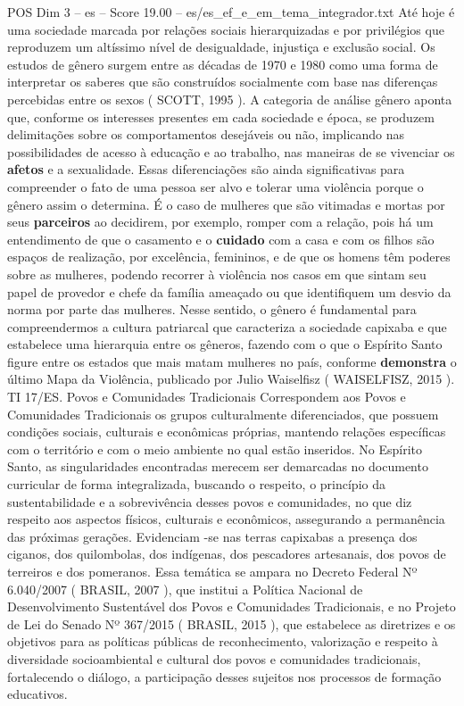 \begin{textsample}{POS Dim 3 – es – Score 19.00 – es/es\_ef\_e\_em\_tema\_integrador.txt}
Até hoje é uma sociedade marcada por relações sociais hierarquizadas e por privilégios que reproduzem um altíssimo nível de desigualdade, injustiça e exclusão social.
Os estudos de gênero surgem entre as décadas de 1970 e 1980 como uma forma de interpretar os saberes que são construídos socialmente com base nas diferenças percebidas entre os sexos ( SCOTT, 1995 ).
A categoria de análise gênero aponta que, conforme os interesses presentes em cada sociedade e época, se produzem delimitações sobre os comportamentos desejáveis ou não, implicando nas possibilidades de acesso à educação e ao trabalho, nas maneiras de se vivenciar os \textbf{afetos} e a sexualidade.
Essas diferenciações são ainda significativas para compreender o fato de uma pessoa ser alvo e tolerar uma violência porque o gênero assim o determina.
É o caso de mulheres que são vitimadas e mortas por seus \textbf{parceiros} ao decidirem, por exemplo, romper com a relação, pois há um entendimento de que o casamento e o \textbf{cuidado} com a casa e com os filhos são espaços de realização, por excelência, femininos, e de que os homens têm poderes sobre as mulheres, podendo recorrer à violência nos casos em que sintam seu papel de provedor e chefe da família ameaçado ou que identifiquem um desvio da norma por parte das mulheres.
Nesse sentido, o gênero é fundamental para compreendermos a cultura patriarcal que caracteriza a sociedade capixaba e que estabelece uma hierarquia entre os gêneros, fazendo com o que o Espírito Santo figure entre os estados que mais matam mulheres no país, conforme \textbf{demonstra} o último Mapa da Violência, publicado por Julio Waiselfisz ( WAISELFISZ, 2015 ).
TI 17/ES.
Povos e Comunidades Tradicionais Correspondem aos Povos e Comunidades Tradicionais os grupos culturalmente diferenciados, que possuem condições sociais, culturais e econômicas próprias, mantendo relações específicas com o território e com o meio ambiente no qual estão inseridos.
No Espírito Santo, as singularidades encontradas merecem ser demarcadas no documento curricular de forma integralizada, buscando o respeito, o princípio da sustentabilidade e a sobrevivência desses povos e comunidades, no que diz respeito aos aspectos físicos, culturais e econômicos, assegurando a permanência das próximas gerações.
Evidenciam -se nas terras capixabas a presença dos ciganos, dos quilombolas, dos indígenas, dos pescadores artesanais, dos povos de terreiros e dos pomeranos.
Essa temática se ampara no Decreto Federal Nº 6.040/2007 ( BRASIL, 2007 ), que institui a Política Nacional de Desenvolvimento Sustentável dos Povos e Comunidades Tradicionais, e no Projeto de Lei do Senado Nº 367/2015 ( BRASIL, 2015 ), que estabelece as diretrizes e os objetivos para as políticas públicas de reconhecimento, valorização e respeito à diversidade socioambiental e cultural dos povos e comunidades tradicionais, fortalecendo o diálogo, a participação desses sujeitos nos processos de formação educativos.

\end{textsample}
